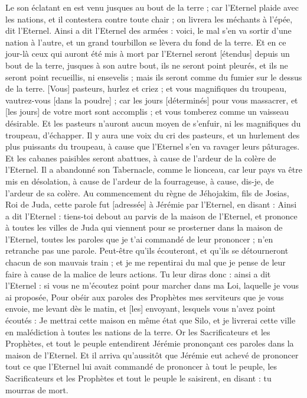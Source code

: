 \begin{multicols}{2}
Le son éclatant en est venu jusques au bout de la terre ; car l'Eternel plaide avec les nations, et il contestera contre toute chair ; on livrera les méchants à l'épée, dit l'Eternel.
Ainsi a dit l'Eternel des armées : voici, le mal s'en va sortir d'une nation à l'autre, et un grand tourbillon se lèvera du fond de la terre.
Et en ce jour-là ceux qui auront été mis à mort par l'Eternel seront [étendus] depuis un bout de la terre, jusques à son autre bout, ils ne seront point pleurés, et ils ne seront point recueillis, ni ensevelis ; mais ils seront comme du fumier sur le dessus de la terre.
[Vous] pasteurs, hurlez et criez ; et vous magnifiques du troupeau, vautrez-vous [dans la poudre] ; car les jours [déterminés] pour vous massacrer, et [les jours] de votre mort sont accomplis ; et vous tomberez comme un vaisseau désirable.
Et les pasteurs n'auront aucun moyen de s'enfuir, ni les magnifiques du troupeau, d'échapper.
Il y aura une voix du cri des pasteurs, et un hurlement des plus puissants du troupeau, à cause que l'Eternel s'en va ravager leurs pâturages.
Et les cabanes paisibles seront abattues, à cause de l'ardeur de la colère de l'Eternel.
Il a abandonné son Tabernacle, comme le lionceau, car leur pays va être mis en désolation, à cause de l'ardeur de la fourrageuse, à cause, dis-je, de l'ardeur de sa colère.
\VerseOne{}Au commencement du règne de Jéhojakim, fils de Josias, Roi de Juda, cette parole fut [adressée] à Jérémie par l'Eternel, en disant :
Ainsi a dit l'Eternel : tiens-toi debout au parvis de la maison de l'Eternel, et prononce à toutes les villes de Juda qui viennent pour se prosterner dans la maison de l'Eternel, toutes les paroles que je t'ai commandé de leur prononcer ; n'en retranche pas une parole.
Peut-être qu'ils écouteront, et qu'ils se détourneront chacun de son mauvais train ; et je me repentirai du mal que je pense de leur faire à cause de la malice de leurs actions.
Tu leur diras donc : ainsi a dit l'Eternel : si vous ne m'écoutez point pour marcher dans ma Loi, laquelle je vous ai proposée,
Pour obéir aux paroles des Prophètes mes serviteurs que je vous envoie, me levant dès le matin, et [les] envoyant, lesquels vous n'avez point écoutés :
Je mettrai cette maison en même état que Silo, et je livrerai cette ville en malédiction à toutes les nations de la terre.
Or les Sacrificateurs et les Prophètes, et tout le peuple entendirent Jérémie prononçant ces paroles dans la maison de l'Eternel.
Et il arriva qu'aussitôt que Jérémie eut achevé de prononcer tout ce que l'Eternel lui avait commandé de prononcer à tout le peuple, les Sacrificateurs et les Prophètes et tout le peuple le saisirent, en disant : tu mourras de mort.

\end{multicols}
